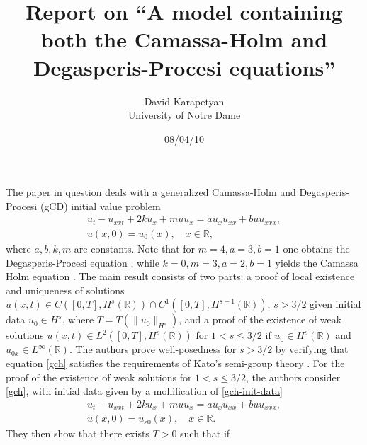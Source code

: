 \documentclass[12pt,reqno]{amsart}
\numberwithin{equation}{section}  %
\numberwithin{figure}{section}
\newcommand{\rr}{\mathbb{R}}
\newcommand{\ee}{\varepsilon}
\theoremstyle{plain}
\theoremstyle{definition}
\theoremstyle{remark}
\begin{document}
\title{Report on ``A model containing both the Camassa-Holm and
Degasperis-Procesi equations''}
\author{David Karapetyan \\ University of Notre Dame}
\address{Department of Mathematics  \\
         University  of Notre Dame\\
         Notre Dame, IN 46556 }
				  \date{08/04/10}
				  \maketitle
				  \parindent0in
				  \parskip0.1in
				  \setcounter{equation}{0}
				  The paper in question deals with a generalized 
				  Camassa-Holm and Degasperis-Procesi (gCD) initial 
				  value problem%
%
\begin{gather}
	\label{gch}
	u_t - u_{xxt} + 2ku_x + mu u_x=au_x u_{xx} + buu_{xxx}, 		\\
		\label{gch-init-data}
		u(x,0) = u_0(x), \quad x \in \rr,
\end{gather}
%
%
where $a,b,k,m$ are constants. Note that for $m=4, a=3, b=1$ one obtains the
Degasperis-Procesi equation
\cite{Degasperis-Procesi-1999-Asymptotic-integrability}, while $k =0, m=3, a=2,
b=1$ yields the Camassa Holm equation
\cite{Camassa-Holm-1993-An-integrable-shallow-water}. The main result consists of two parts: a proof of local existence and uniqueness of solutions $u(x,t) \in C([0, T], H^s(\rr)) \cap 
C^1([0, T], H^{s-1}(\rr))$, $s > 3/2$
given initial data $u_0 \in H^s$, 
where $T = T(\|u_0\|_{H^s})$, and a proof of the existence of weak 
solutions $u(x,t) \in L^2([0,T], H^s(\rr))$ for $1 < s \le 3/2$ if $u_0 \in 
H^s(\rr)$ and $u_{0x} \in L^\infty(\rr)$. The authors prove well-posedness
for $s>3/2$ by verifying that equation \eqref{gch} satisfies the
requirements of Kato's semi-group theory
\cite{Kato-1975-Quasi-linear-equations-of-evolution}. For the proof of the existence of weak
solutions for $1 <s \le 3/2$, the authors consider \eqref{gch}, with initial data given by a mollification of
\eqref{gch-init-data}
%
	\begin{gather}
	\label{gch-regular}
	u_t - u_{xxt} + 2ku_x + mu u_x=au_x u_{xx} + buu_{xxx}, 		\\
		\label{gch-init-data-moll}
		u(x,0) = u_{\ee 0} (x), \quad x \in \rr.
	\end{gather}
	They then show that there exists $T>0$ such that if
\end{document}
